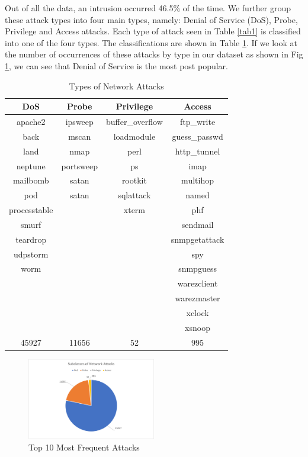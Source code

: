 \documentclass[conference]{IEEEtran}
\begin{document}
Out of all the data, an intrusion occurred 46.5\% of the time. We further group these attack types into four main types, namely: Denial of Service (DoS), Probe, Privilege and Access attacks. Each type of attack seen in Table \ref{tab1} is classified into one of the four types. The classifications are shown in Table \ref{tab2}. If we look at the number of occurrences of these attacks by type in our dataset as shown in Fig \ref{fig2}, we can see that Denial of Service is the most post popular.

\begin{table}[htbp]
\caption{Types of Network Attacks}
\begin{center}
\begin{tabular}{|c|c|c|c|}
\hline
DoS	&	Probe	&	Privilege	&	Access	\\
\hline
apache2	&	ipsweep	&	buffer\_overflow	&	ftp\_write	\\
back	&	mscan	&	loadmodule	&	guess\_passwd	\\
land	&	nmap	&	perl	&	http\_tunnel	\\
neptune	&	portsweep	&	ps	&	imap	\\
mailbomb	&	satan	&	rootkit	&	multihop	\\
pod	&	satan	&	sqlattack	&	named	\\
processtable	&		&	xterm	&	phf	\\
smurf	&		&		&	sendmail	\\
teardrop	&		&		&	snmpgetattack	\\
udpstorm	&		&		&	spy	\\
worm	&		&		&	snmpguess	\\
	&		&		&	warezclient	\\
	&		&		&	warezmaster	\\
	&		&		&	xclock	\\
	&		&		&	xsnoop	\\
\hline
45927 &	 11656  &	 52  &	995
	\\
\hline
\end{tabular}
\label{tab2}
\end{center}
\end{table}

\begin{figure}[htbp]
\centerline{\includegraphics[height= 170 pt, width=0.50\textwidth]{External/Fig-Subclasses-of-Attacks.PNG}}
\caption{Top 10 Most Frequent Attacks}
\label{fig2}
\end{figure}
\end{document}

